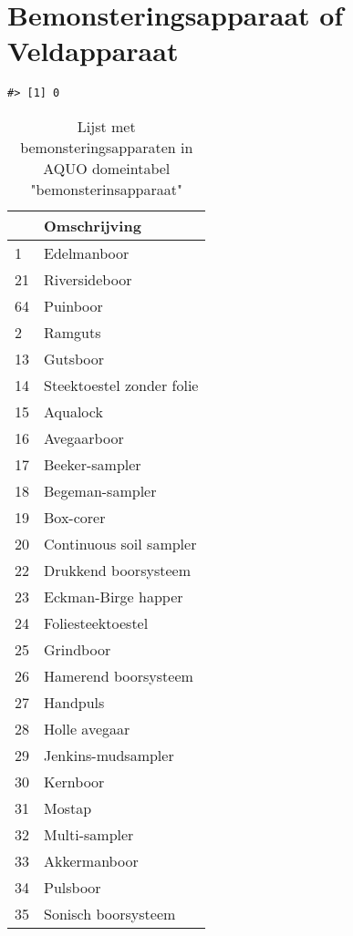 \documentclass[
]{book}
\begin{document}
\hypertarget{bemonsteringsapparaat-of-veldapparaat}{%
\section{Bemonsteringsapparaat of Veldapparaat}\label{bemonsteringsapparaat-of-veldapparaat}}

\begin{verbatim}
#> [1] 0
\end{verbatim}

\begin{table}

\caption{\label{tab:unnamed-chunk-2}Lijst met bemonsteringsapparaten in AQUO domeintabel "bemonsterinsapparaat"}
\centering
\begin{tabular}[t]{l|l}
\hline
  & Omschrijving\\
\hline
1 & Edelmanboor\\
\hline
21 & Riversideboor\\
\hline
64 & Puinboor\\
\hline
2 & Ramguts\\
\hline
13 & Gutsboor\\
\hline
14 & Steektoestel zonder folie\\
\hline
15 & Aqualock\\
\hline
16 & Avegaarboor\\
\hline
17 & Beeker-sampler\\
\hline
18 & Begeman-sampler\\
\hline
19 & Box-corer\\
\hline
20 & Continuous soil sampler\\
\hline
22 & Drukkend boorsysteem\\
\hline
23 & Eckman-Birge happer\\
\hline
24 & Foliesteektoestel\\
\hline
25 & Grindboor\\
\hline
26 & Hamerend boorsysteem\\
\hline
27 & Handpuls\\
\hline
28 & Holle avegaar\\
\hline
29 & Jenkins-mudsampler\\
\hline
30 & Kernboor\\
\hline
31 & Mostap\\
\hline
32 & Multi-sampler\\
\hline
33 & Akkermanboor\\
\hline
34 & Pulsboor\\
\hline
35 & Sonisch boorsysteem\\

\end{tabular}
\end{table}
\end{document}
